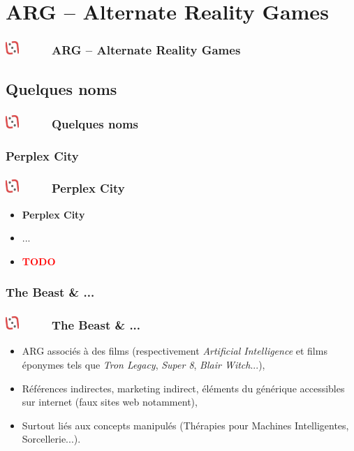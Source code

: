 \documentclass[slidetop,11pt]{beamer}
\def\sectionPartII{ARG -- Alternate Reality Games}
\def\sectionPartIIa{Quelques noms}
\def\sectionPartIIaI{Perplex City}
\def\sectionPartIIaII{The Beast \& ... }
\def\moreInFrameTitleLeftt{\includegraphics[height=0.5cm]{img/ligueludique-0.png}~~~~~}
\begin{document}

\section{\sectionPartII}
\begin{frame}
	\frametitle{\moreInFrameTitleLeftt \sectionPartII}
	\tableofcontents[sections=2,currentsection,subsectionstyle=show/shaded/hide] %
\end{frame} 

\subsection{\sectionPartIIa}
\begin{frame}
	\frametitle{\moreInFrameTitleLeftt \sectionPartIIa }
	\tableofcontents[sections=2,currentsection,subsectionstyle=show/shaded/hide]
\end{frame} 

\subsubsection{\sectionPartIIaI}
\begin{frame}
	\frametitle{\moreInFrameTitleLeftt \sectionPartIIaI }
	\begin{itemize}
		\item \textbf{ \sectionPartIIaI }
		\item[] ...
		\item \textcolor{red}{ \textbf{TODO} }
	\end{itemize}
\end{frame} 

\subsubsection{\sectionPartIIaII}
\begin{frame}
	\frametitle{\moreInFrameTitleLeftt \sectionPartIIaII }
	\begin{itemize}
		\item ARG associ{\'e}s {\`a} des films (respectivement \emph{Artificial Intelligence} et films {\'e}ponymes tels que \emph{Tron Legacy}, \emph{Super 8}, \emph{Blair Witch}...), 
		\item R{\'e}f{\'e}rences indirectes, marketing indirect, {\'e}l{\'e}ments du g{\'e}n{\'e}rique accessibles sur internet (faux sites web notamment), 
		\item Surtout li{\'e}s aux concepts manipul{\'e}s (Th{\'e}rapies pour Machines Intelligentes, Sorcellerie...). 
	\end{itemize}
\end{frame} 
\end{document}
